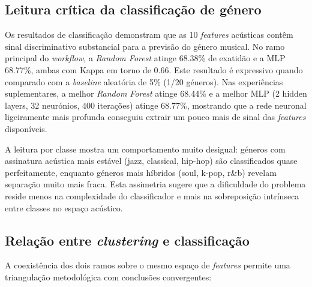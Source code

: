 \documentclass[11pt,a4paper]{article}
\begin{document}
\subsection{Leitura crítica da classificação de género}

Os resultados de classificação demonstram que as 10 \textit{features} acústicas contêm sinal discriminativo substancial para a previsão do género musical. No ramo principal do \textit{workflow}, a \textit{Random Forest} atinge 68.38\% de exatidão e a MLP 68.77\%, ambas com Kappa em torno de 0.66. Este resultado é expressivo quando comparado com a \textit{baseline} aleatória de 5\% (1/20 géneros). Nas experiências suplementares, a melhor \textit{Random Forest} atinge 68.44\% e a melhor MLP (2 hidden layers, 32 neurónios, 400 iterações) atinge 68.77\%, mostrando que a rede neuronal ligeiramente mais profunda conseguiu extrair um pouco mais de sinal das \textit{features} disponíveis.

A leitura por classe mostra um comportamento muito desigual: géneros com assinatura acústica mais estável (jazz, classical, hip-hop) são classificados quase perfeitamente, enquanto géneros mais híbridos (soul, k-pop, r\&b) revelam separação muito mais fraca. Esta assimetria sugere que a dificuldade do problema reside menos na complexidade do classificador e mais na sobreposição intrínseca entre classes no espaço acústico.

\subsection{Relação entre \textit{clustering} e classificação}

A coexistência dos dois ramos sobre o mesmo espaço de \textit{features} permite uma triangulação metodológica com conclusões convergentes:
\end{document}
